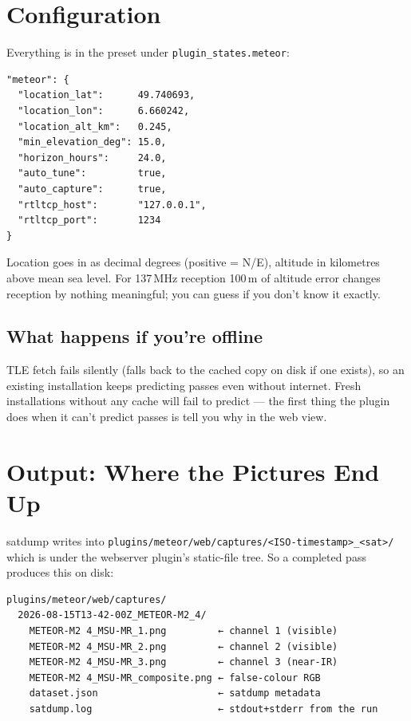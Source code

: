 \documentclass[11pt,a4paper]{article}
\begin{document}
\section{Configuration}

Everything is in the preset under
\texttt{plugin\_states.meteor}:

\begin{lstlisting}
"meteor": {
  "location_lat":      49.740693,
  "location_lon":      6.660242,
  "location_alt_km":   0.245,
  "min_elevation_deg": 15.0,
  "horizon_hours":     24.0,
  "auto_tune":         true,
  "auto_capture":      true,
  "rtltcp_host":       "127.0.0.1",
  "rtltcp_port":       1234
}
\end{lstlisting}

Location goes in as decimal degrees (positive = N/E), altitude in
kilometres above mean sea level.  For 137\,MHz reception 100\,m of
altitude error changes reception by nothing meaningful; you can guess
if you don't know it exactly.

\subsection{What happens if you're offline}

TLE fetch fails silently (falls back to the cached copy on disk if
one exists), so an existing installation keeps predicting passes
even without internet.  Fresh installations without any cache will
fail to predict — the first thing the plugin does when it can't
predict passes is tell you why in the web view.

\section{Output: Where the Pictures End Up}

satdump writes into
\texttt{plugins/meteor/web/captures/<ISO-timestamp>\_<sat>/}
which is under the webserver plugin's static-file tree.  So a
completed pass produces this on disk:

\begin{lstlisting}
plugins/meteor/web/captures/
  2026-08-15T13-42-00Z_METEOR-M2_4/
    METEOR-M2 4_MSU-MR_1.png         ← channel 1 (visible)
    METEOR-M2 4_MSU-MR_2.png         ← channel 2 (visible)
    METEOR-M2 4_MSU-MR_3.png         ← channel 3 (near-IR)
    METEOR-M2 4_MSU-MR_composite.png ← false-colour RGB
    dataset.json                     ← satdump metadata
    satdump.log                      ← stdout+stderr from the run
\end{lstlisting}
\end{document}
